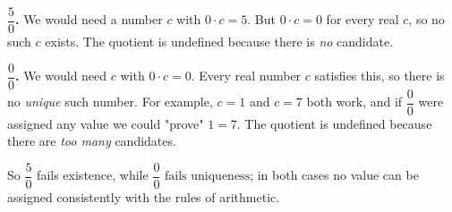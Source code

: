 \textbf{$\dfrac{5}{0}$.} We would need a number $c$ with $0\cdot c=5$. But $0\cdot c=0$ for every real $c$, so no such $c$ exists. The quotient is undefined because there is \emph{no} candidate.

\textbf{$\dfrac{0}{0}$.} We would need $c$ with $0\cdot c=0$. Every real number $c$ satisfies this, so there is no \emph{unique} such number. For example, $c=1$ and $c=7$ both work, and if $\dfrac{0}{0}$ were assigned any value we could "prove" $1=7$. The quotient is undefined because there are \emph{too many} candidates.

So $\dfrac{5}{0}$ fails existence, while $\boxed{\dfrac{0}{0}\text{ fails uniqueness}}$; in both cases no value can be assigned consistently with the rules of arithmetic.

